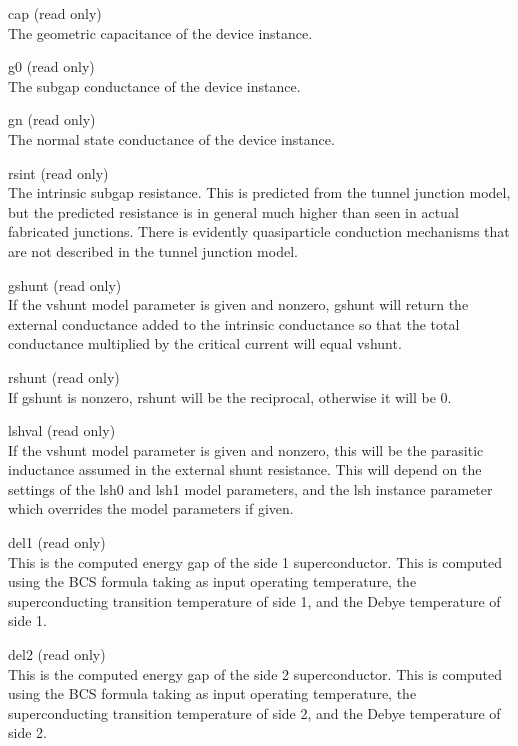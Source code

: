 \begin{description}
\item{\vt cap} (read only)\\
The geometric capacitance of the device instance.

\item{\vt g0} (read only)\\
The subgap conductance of the device instance.

\item{\vt gn} (read only)\\
The normal state conductance of the device instance.

\item{\vt rsint} (read only)\\
The intrinsic subgap resistance.  This is predicted from the tunnel
junction model, but the predicted resistance is in general much higher
than seen in actual fabricated junctions.  There is evidently
quasiparticle conduction mechanisms that are not described in the
tunnel junction model.

\item{\vt gshunt} (read only)\\
If the {\vt vshunt} model parameter is given and nonzero,
{\vt gshunt} will return the external conductance added to the
intrinsic conductance so that the total conductance multiplied
by the critical current will equal {\vt vshunt}.

\item{\vt rshunt} (read only)\\
If {\vt gshunt} is nonzero, {\vt rshunt} will be the reciprocal,
otherwise it will be 0.

\item{\vt lshval} (read only)\\
If the {\vt vshunt} model parameter is given and nonzero, this will be
the parasitic inductance assumed in the external shunt resistance. 
This will depend on the settings of the {\vt lsh0} and {\vt lsh1}
model parameters, and the {\vt lsh} instance parameter which overrides
the model parameters if given.

\item{\vt del1} (read only)\\
This is the computed energy gap of the side 1 superconductor. 
This is computed using the BCS formula taking as input operating
temperature, the superconducting transition temperature of side 1,
and the Debye temperature of side 1.

\item{\vt del2} (read only)\\
This is the computed energy gap of the side 2 superconductor. 
This is computed using the BCS formula taking as input operating
temperature, the superconducting transition temperature of side 2,
and the Debye temperature of side 2.


\end{description}
